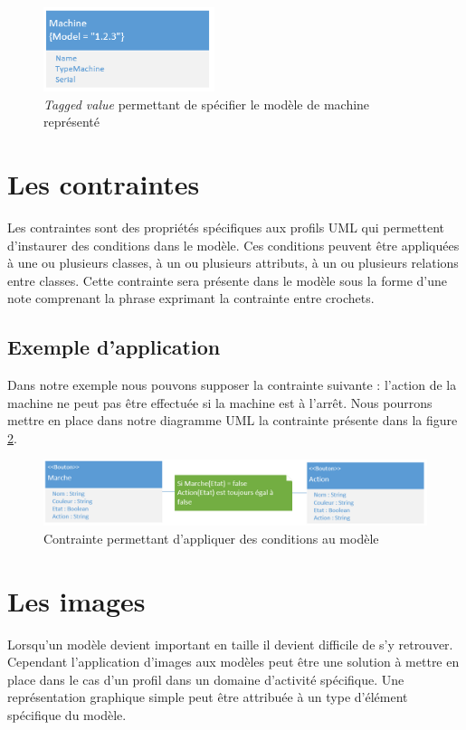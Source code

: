 \begin{figure}[H]
    \begin{center}
    \includegraphics[width=5cm]{10_img/chap4/machine.PNG}
    \caption{\emph{Tagged value} permettant de spécifier le modèle de machine représenté}
    \label{fig.uml_mac}
    \end{center}
\end{figure}


\newpage
\section{Les contraintes}
Les contraintes sont des propriétés spécifiques aux profils UML qui permettent d'instaurer des conditions dans le modèle.
Ces conditions peuvent être appliquées à une ou plusieurs classes, à un ou plusieurs attributs, à un ou plusieurs relations entre classes.
Cette contrainte sera présente dans le modèle sous la forme d'une note comprenant la phrase exprimant la contrainte entre crochets.

\subsection{Exemple d'application}
Dans notre exemple nous pouvons supposer la contrainte suivante : l'action de la machine ne peut pas être effectuée si la machine est à l'arrêt.
Nous pourrons mettre en place dans notre diagramme UML la contrainte présente dans la figure \ref{fig.uml_con}.

\begin{figure}[H]
    \begin{center}
    \includegraphics[width=12cm]{10_img/chap4/constraint.PNG}
    \caption{Contrainte permettant d'appliquer des conditions au modèle}
    \label{fig.uml_con}
    \end{center}
\end{figure}


\newpage
\section{Les images}
Lorsqu'un modèle devient important en taille il devient difficile de s'y retrouver.
Cependant l'application d'images aux modèles peut être une solution à mettre en place dans le cas d'un profil dans un domaine d'activité spécifique.
Une représentation graphique simple peut être attribuée à un type d'élément spécifique du modèle.

